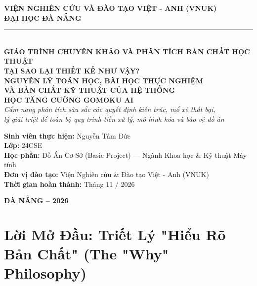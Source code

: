 \documentclass[11pt,a4paper]{report}
\begin{document}
\begin{titlepage}
\begin{center}
    {\large \textbf{VIỆN NGHIÊN CỨU VÀ ĐÀO TẠO VIỆT - ANH (VNUK)}}\\[4pt]
    {\large \textbf{ĐẠI HỌC ĐÀ NẴNG}}\\[8pt]
    \rule{0.6\textwidth}{1.2pt}\\[2.0cm]

    {\large \textbf{GIÁO TRÌNH CHUYÊN KHẢO VÀ PHÂN TÍCH BẢN CHẤT HỌC THUẬT}}\\[10pt]
    {\LARGE \bfseries \color{primary} TẠI SAO LẠI THIẾT KẾ NHƯ VẬY?\\NGUYÊN LÝ TOÁN HỌC, BÀI HỌC THỰC NGHIỆM\\VÀ BẢN CHẤT KỸ THUẬT CỦA HỆ THỐNG\\HỌC TĂNG CƯỜNG GOMOKU AI}\\[14pt]
    {\large \textit{Cẩm nang phân tích sâu sắc các quyết định kiến trúc, mổ xẻ thất bại,\\lý giải triệt để toàn bộ quy trình tiền xử lý, mô hình hóa và bảo vệ đồ án}}\\[2.0cm]

    \begin{minipage}{0.85\textwidth}
        \large
        \textbf{Sinh viên thực hiện:} Nguyễn Tâm Đức\\
        \textbf{Lớp:} 24CSE\\
        \textbf{Học phần:} Đồ Án Cơ Sở (Basic Project) --- Ngành Khoa học \& Kỹ thuật Máy tính\\
        \textbf{Đơn vị đào tạo:} Viện Nghiên cứu \& Đào tạo Việt - Anh (VNUK)\\
        \textbf{Thời gian hoàn thành:} Tháng 11 / 2026
    \end{minipage}

    \vfill
    {\large \textbf{ĐÀ NẴNG -- 2026}}
\end{center}
\end{titlepage}

\chapter*{Lời Mở Đầu: Triết Lý "Hiểu Rõ Bản Chất" (The "Why" Philosophy)}
\end{document}
